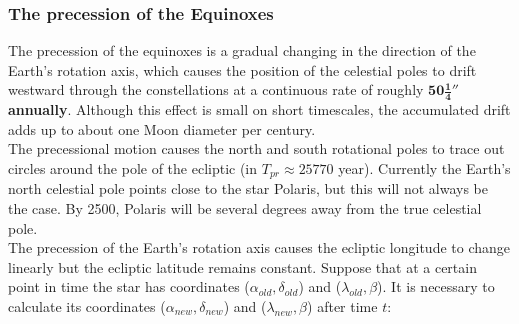 \documentclass[a4paper,12pt]{extarticle}
\begin{document}
\subsubsection{The precession of the Equinoxes}\label{precessional}

The precession of the equinoxes is a gradual changing in the direction of the Earth’s rotation axis, which causes the position of the celestial poles to drift westward through the constellations at a continuous rate of roughly \textbf{$\mathbf{50\frac{1}{4}''}$ annually}. Although this effect is small on short timescales, the accumulated drift adds up to about one Moon diameter per century.\\

The precessional motion causes the north and south rotational poles
to trace out circles around the pole of the ecliptic (in $T_{pr}\approx 25770$ year). Currently the Earth’s north celestial pole points close to the star Polaris, but this will not always be the case. By 2500, Polaris will be several degrees away from the true celestial pole.\\

The precession of the Earth's rotation axis causes the ecliptic longitude to change linearly but the ecliptic latitude remains constant. Suppose that at a certain point in time the star has coordinates ($\alpha_{old}, \delta_{old}$) and ($\lambda_{old}, \beta$). It is necessary to calculate its coordinates ($\alpha_{new}, \delta_{new}$) and ($\lambda_{new}, \beta$) after time $t$: 
\end{document}
